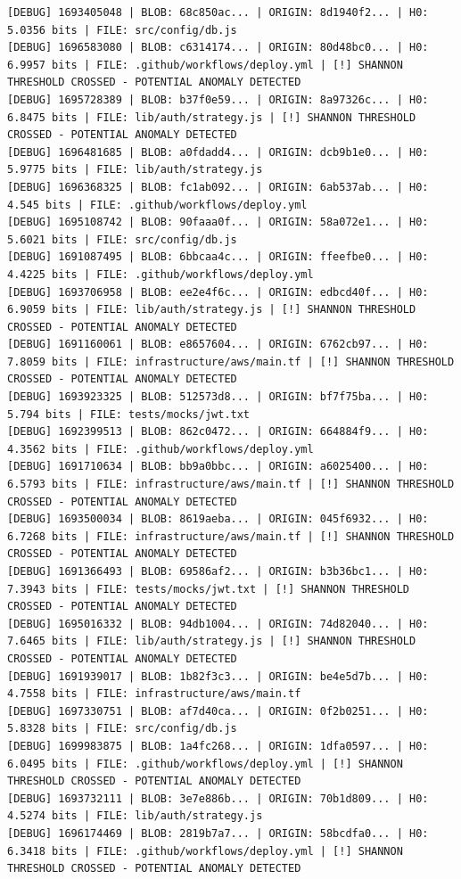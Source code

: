 \documentclass[12pt, a4paper, oneside]{report}
\begin{document}
\begin{lstlisting}[basicstyle=\tiny\ttfamily]
[DEBUG] 1693405048 | BLOB: 68c850ac... | ORIGIN: 8d1940f2... | H0: 5.0356 bits | FILE: src/config/db.js
[DEBUG] 1696583080 | BLOB: c6314174... | ORIGIN: 80d48bc0... | H0: 6.9957 bits | FILE: .github/workflows/deploy.yml | [!] SHANNON THRESHOLD CROSSED - POTENTIAL ANOMALY DETECTED
[DEBUG] 1695728389 | BLOB: b37f0e59... | ORIGIN: 8a97326c... | H0: 6.8475 bits | FILE: lib/auth/strategy.js | [!] SHANNON THRESHOLD CROSSED - POTENTIAL ANOMALY DETECTED
[DEBUG] 1696481685 | BLOB: a0fdadd4... | ORIGIN: dcb9b1e0... | H0: 5.9775 bits | FILE: lib/auth/strategy.js
[DEBUG] 1696368325 | BLOB: fc1ab092... | ORIGIN: 6ab537ab... | H0: 4.545 bits | FILE: .github/workflows/deploy.yml
[DEBUG] 1695108742 | BLOB: 90faaa0f... | ORIGIN: 58a072e1... | H0: 5.6021 bits | FILE: src/config/db.js
[DEBUG] 1691087495 | BLOB: 6bbcaa4c... | ORIGIN: ffeefbe0... | H0: 4.4225 bits | FILE: .github/workflows/deploy.yml
[DEBUG] 1693706958 | BLOB: ee2e4f6c... | ORIGIN: edbcd40f... | H0: 6.9059 bits | FILE: lib/auth/strategy.js | [!] SHANNON THRESHOLD CROSSED - POTENTIAL ANOMALY DETECTED
[DEBUG] 1691160061 | BLOB: e8657604... | ORIGIN: 6762cb97... | H0: 7.8059 bits | FILE: infrastructure/aws/main.tf | [!] SHANNON THRESHOLD CROSSED - POTENTIAL ANOMALY DETECTED
[DEBUG] 1693923325 | BLOB: 512573d8... | ORIGIN: bf7f75ba... | H0: 5.794 bits | FILE: tests/mocks/jwt.txt
[DEBUG] 1692399513 | BLOB: 862c0472... | ORIGIN: 664884f9... | H0: 4.3562 bits | FILE: .github/workflows/deploy.yml
[DEBUG] 1691710634 | BLOB: bb9a0bbc... | ORIGIN: a6025400... | H0: 6.5793 bits | FILE: infrastructure/aws/main.tf | [!] SHANNON THRESHOLD CROSSED - POTENTIAL ANOMALY DETECTED
[DEBUG] 1693500034 | BLOB: 8619aeba... | ORIGIN: 045f6932... | H0: 6.7268 bits | FILE: infrastructure/aws/main.tf | [!] SHANNON THRESHOLD CROSSED - POTENTIAL ANOMALY DETECTED
[DEBUG] 1691366493 | BLOB: 69586af2... | ORIGIN: b3b36bc1... | H0: 7.3943 bits | FILE: tests/mocks/jwt.txt | [!] SHANNON THRESHOLD CROSSED - POTENTIAL ANOMALY DETECTED
[DEBUG] 1695016332 | BLOB: 94db1004... | ORIGIN: 74d82040... | H0: 7.6465 bits | FILE: lib/auth/strategy.js | [!] SHANNON THRESHOLD CROSSED - POTENTIAL ANOMALY DETECTED
[DEBUG] 1691939017 | BLOB: 1b82f3c3... | ORIGIN: be4e5d7b... | H0: 4.7558 bits | FILE: infrastructure/aws/main.tf
[DEBUG] 1697330751 | BLOB: af7d40ca... | ORIGIN: 0f2b0251... | H0: 5.8328 bits | FILE: src/config/db.js
[DEBUG] 1699983875 | BLOB: 1a4fc268... | ORIGIN: 1dfa0597... | H0: 6.0495 bits | FILE: .github/workflows/deploy.yml | [!] SHANNON THRESHOLD CROSSED - POTENTIAL ANOMALY DETECTED
[DEBUG] 1693732111 | BLOB: 3e7e886b... | ORIGIN: 70b1d809... | H0: 4.5274 bits | FILE: lib/auth/strategy.js
[DEBUG] 1696174469 | BLOB: 2819b7a7... | ORIGIN: 58bcdfa0... | H0: 6.3418 bits | FILE: .github/workflows/deploy.yml | [!] SHANNON THRESHOLD CROSSED - POTENTIAL ANOMALY DETECTED
\end{lstlisting}
\end{document}
